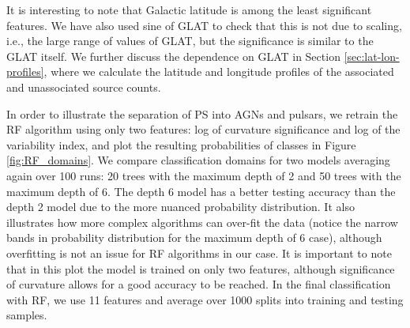 It is interesting to note that Galactic latitude is among the least significant features.
We have also used sine of GLAT to check that this is not due to scaling, i.e., the large range of values of GLAT,
but the significance is similar to the GLAT itself.
We further discuss the dependence on GLAT in Section \ref{sec:lat-lon-profiles}, 
where we calculate the latitude and longitude profiles of the associated and unassociated source counts.

In order to illustrate the separation of PS into AGNs and pulsars, we retrain the RF algorithm using only two features: log of curvature significance and log of the variability index, and plot the resulting probabilities of classes in Figure \ref{fig:RF_domains}. 
We compare classification domains for two models averaging again over 100 runs: 20 trees with the maximum depth of 2 and 50 trees with the maximum depth of 6.
The depth 6 model has a better testing accuracy than the 
depth 2 model due to the more nuanced probability distribution. 
It also illustrates how more complex algorithms can over-fit the data 
(notice the narrow bands in probability distribution for the maximum depth of 6 case), 
although overfitting is not an issue for RF algorithms in our case.
It is important to note that in this plot the model is trained on only two features, although significance of curvature allows for a good accuracy to be reached. In the final classification with RF, we use 11 features and average over 1000 splits into training and testing samples.

